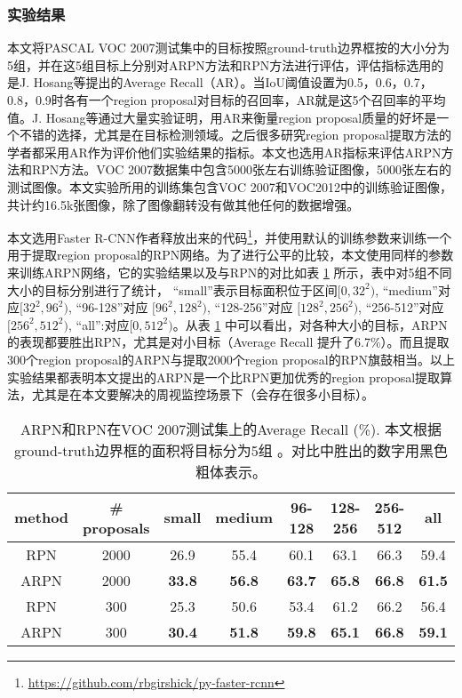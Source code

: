 \subsubsection{实验结果}
本文将PASCAL VOC 2007测试集中的目标按照ground-truth边界框按的大小分为5组，并在这5组目标上分别对ARPN方法和RPN方法进行评估，评估指标选用的是J. Hosang等提出的Average Recall（AR）\cite{proposal}。当IoU阈值设置为0.5，0.6，0.7，0.8，0.9时各有一个region proposal对目标的召回率，AR就是这5个召回率的平均值。J. Hosang等通过大量实验证明，用AR来衡量region proposal质量的好坏是一个不错的选择，尤其是在目标检测领域。之后很多研究region proposal提取方法的学者都采用AR作为评价他们实验结果的指标。本文也选用AR指标来评估ARPN方法和RPN方法。VOC 2007数据集中包含5000张左右训练验证图像，5000张左右的测试图像。本文实验所用的训练集包含VOC 2007和VOC2012中的训练验证图像，共计约16.5k张图像，除了图像翻转没有做其他任何的数据增强。

本文选用Faster R-CNN作者释放出来的代码\footnote{\url{https://github.com/rbgirshick/py-faster-rcnn}}，并使用默认的训练参数来训练一个用于提取region proposal的RPN网络。为了进行公平的比较，本文使用同样的参数来训练ARPN网络，它的实验结果以及与RPN的对比如表 \ref{tab:average_recall} 所示，表中对5组不同大小的目标分别进行了统计， ``small''表示目标面积位于区间$[0, 32^{2})$, ``medium''对应$[32^2, 96^2)$, ``96-128''对应 $[96^2, 128^2)$, ``128-256''对应 $[128^2, 256^2)$, ``256-512''对应 $[256^2, 512^2)$, ``all'':对应$[0, 512^2)$。从表 \ref{tab:average_recall} 中可以看出，对各种大小的目标，ARPN的表现都要胜出RPN，尤其是对小目标（Average Recall 提升了6.7\%）。而且提取300个region proposal的ARPN与提取2000个region proposal的RPN旗鼓相当。以上实验结果都表明本文提出的ARPN是一个比RPN更加优秀的region proposal提取算法，尤其是在本文要解决的周视监控场景下（会存在很多小目标）。
\begin{table}[h]
	\caption{ARPN和RPN在VOC 2007测试集上的Average Recall (\%). 本文根据ground-truth边界框的面积将目标分为5组 。对比中胜出的数字用黑色粗体表示。} %
	\centering
	\begin{tabular} {cc*{5}{c}c}
		\toprule
		method & \# proposals & small   & medium   & 96-128  & 128-256 & 256-512 & all\\
		\midrule
		\!\!\!\! RPN \!\!\!\!   & 2000 \!\!\!\! & 26.9 \!\!\!\! & 55.4 \!\!\!\! & 60.1 \!\!\!\! & 63.1 \!\!\!\! & 66.3 & 59.4 \!\!\!\! \\
		\!\!\!\! ARPN \!\!\!\!  & 2000 \!\!\!\! & \textbf{33.8} \!\!\!\! & \textbf{56.8} \!\!\!\! & \textbf{63.7} \!\!\!\! & \textbf{65.8} \!\!\!\! & \textbf{66.8} & \textbf{61.5} \!\!\!\! \\
	    \hline\hline
		\!\!\!\! RPN \!\!\!\!   & 300 \!\!\!\! & 25.3 \!\!\!\! & 50.6 \!\!\!\! & 53.4 \!\!\!\! & 61.2 \!\!\!\! & 66.2 & 56.4 \!\!\!\! \\
		\!\!\!\! ARPN \!\!\!\!  & 300 \!\!\!\! & \textbf{30.4} \!\!\!\! & \textbf{51.8} \!\!\!\! & \textbf{59.8} \!\!\!\! & \textbf{65.1} \!\!\!\! & \textbf{66.8} & \textbf{59.1} \!\!\!\! \\
		\bottomrule
	\end{tabular}%
	\label{tab:average_recall}%
\end{table}%

